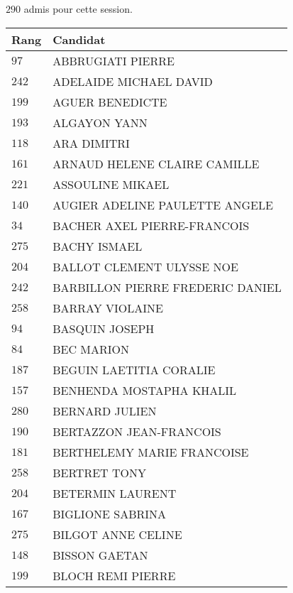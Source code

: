 



  $290$ admis pour cette session.

  \begin{xltabular}{\linewidth}{|l|X|}
    \hline
    \textbf{Rang} & \textbf{Candidat} \\
    \hline
    $97$ & ABBRUGIATI PIERRE \\
    \hline
    $242$ & ADELAIDE MICHAEL DAVID \\
    \hline
    $199$ & AGUER BENEDICTE \\
    \hline
    $193$ & ALGAYON YANN \\
    \hline
    $118$ & ARA DIMITRI \\
    \hline
    $161$ & ARNAUD HELENE CLAIRE CAMILLE \\
    \hline
    $221$ & ASSOULINE MIKAEL \\
    \hline
    $140$ & AUGIER ADELINE PAULETTE ANGELE \\
    \hline
    $34$ & BACHER AXEL PIERRE-FRANCOIS \\
    \hline
    $275$ & BACHY ISMAEL \\
    \hline
    $204$ & BALLOT CLEMENT ULYSSE NOE \\
    \hline
    $242$ & BARBILLON PIERRE FREDERIC DANIEL \\
    \hline
    $258$ & BARRAY VIOLAINE \\
    \hline
    $94$ & BASQUIN JOSEPH \\
    \hline
    $84$ & BEC MARION \\
    \hline
    $187$ & BEGUIN LAETITIA CORALIE \\
    \hline
    $157$ & BENHENDA MOSTAPHA KHALIL \\
    \hline
    $280$ & BERNARD JULIEN \\
    \hline
    $190$ & BERTAZZON JEAN-FRANCOIS \\
    \hline
    $181$ & BERTHELEMY MARIE FRANCOISE \\
    \hline
    $258$ & BERTRET TONY \\
    \hline
    $204$ & BETERMIN LAURENT \\
    \hline
    $167$ & BIGLIONE SABRINA \\
    \hline
    $275$ & BILGOT ANNE CELINE \\
    \hline
    $148$ & BISSON GAETAN \\
    \hline
    $199$ & BLOCH REMI PIERRE \\

\end{xltabular}
